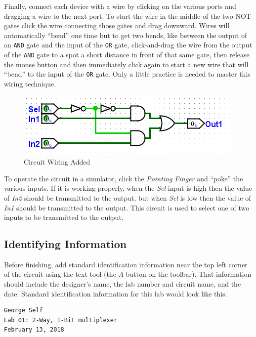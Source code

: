 Finally, connect each device with a wire by clicking on the various ports and dragging a wire to the next port. To start the wire in the middle of the two NOT gates click the wire connecting those gates and drag downward. Wires will automatically ``bend'' one time but to get two bends, like between the output of an \texttt{AND} gate and the input of the \texttt{OR} gate, click-and-drag the wire from the output of the \texttt{AND} gate to a spot a short distance in front of that same gate, then release the mouse button and then immediately click again to start a new wire that will ``bend'' to the input of the \texttt{OR} gate. Only a little practice is needed to master this wiring technique.

\begin{figure}[H]
	\centering
	\includegraphics[width=\maxwidth{.95\linewidth}]{gfx/intro-07}
	\caption{Circuit Wiring Added}
	\label{fig:intro-07}
\end{figure}

To operate the circuit in a simulator, click the \textit{Pointing Finger} and ``poke'' the various inputs. If it is working properly, when the \textit{Sel} input is high then the value of \textit{In2} should be transmitted to the output, but when \textit{Sel} is low then the value of \textit{In1} should be transmitted to the output. This circuit is used to select one of two inputs to be transmitted to the output.

\subsection{Identifying Information}

Before finishing, add standard identification information near the top left corner of the circuit using the text tool (the \textit{A} button on the toolbar). That information should include the designer's name, the lab number and circuit name, and the date. Standard identification information for this lab would look like this:

\bigskip
\begin{minipage}{\linewidth}
\begin{verbatim}
George Self
Lab 01: 2-Way, 1-Bit multiplexer
February 13, 2018
\end{verbatim}
\end{minipage}
\bigskip

